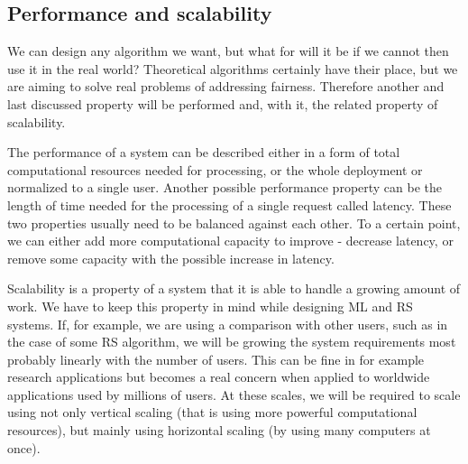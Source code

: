 \subsection*{Performance and scalability}

We can design any algorithm we want, but what for will it be if we cannot then use it in the real world? Theoretical algorithms certainly have their place, but we are aiming to solve real problems of addressing fairness. Therefore another and last discussed property will be performed and, with it, the related property of scalability.

The performance of a system can be described either in a form of total computational resources needed for processing, or the whole deployment or normalized to a single user. Another possible performance property can be the length of time needed for the processing of a single request called latency. These two properties usually need to be balanced against each other. To a certain point, we can either add more computational capacity to improve - decrease latency, or remove some capacity with the possible increase in latency.

Scalability is a property of a system that it is able to handle a growing amount of work. We have to keep this property in mind while designing ML and RS systems. If, for example, we are using a comparison with other users, such as in the case of some RS algorithm, we will be growing the system requirements most probably linearly with the number of users. This can be fine in for example research applications but becomes a real concern when applied to worldwide applications used by millions of users. At these scales, we will be required to scale using not only vertical scaling (that is using more powerful computational resources), but mainly using horizontal scaling (by using many computers at once).


